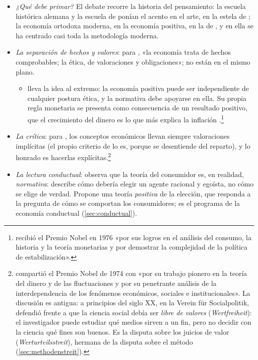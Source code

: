 \documentclass[11pt]{article}
\begin{document}
\begin{itemize}
\item \emph{¿Qué debe primar?} El debate recorre la historia del pensamiento: la escuela histórica alemana y la escuela de  ponían el acento en el arte, en la estela de ; la economía ortodoxa moderna, en la economía positiva, en la de , y en ella se ha centrado casi toda la metodología moderna.
\item \emph{La separación de hechos y valores}: para \textcite[pág.~132]{Robbins1932Essay}, «la economía trata de hechos comprobables; la ética, de valoraciones y obligaciones»; no están en el mismo plano.
  \begin{itemize}
  \item \textcite{Friedman1953Methodology} lleva la idea al extremo: la economía positiva puede ser independiente de cualquier postura ética, y la normativa debe apoyarse en ella. Su propia regla monetaria se presenta como consecuencia de un resultado positivo, que el crecimiento del dinero es lo que más explica la inflación .\footnote{ recibió el Premio Nobel en 1976 «por sus logros en el análisis del consumo, la historia y la teoría monetarias y por demostrar la complejidad de la política de estabilización»\nocite{Nobel1976Friedman}.}
  \end{itemize}
\item \emph{La crítica}: para  \parencite*{Myrdal1953Political}, los conceptos económicos llevan siempre valoraciones implícitas (el propio criterio de  lo es, porque se desentiende del reparto), y lo honrado es hacerlas explícitas.\footnote{ compartió el Premio Nobel de 1974 con  «por su trabajo pionero en la teoría del dinero y de las fluctuaciones y por su penetrante análisis de la interdependencia de los fenómenos económicos, sociales e institucionales»\nocite{Nobel1974}. La discusión es antigua: a principios del siglo XX, en la Verein für Socialpolitik,  defendió frente a  que la ciencia social debía ser \emph{libre de valores} (\emph{Wertfreiheit}): el investigador puede estudiar qué medios sirven a un fin, pero no decidir con la ciencia qué fines son buenos\nocite{Weber1904Objektivitat}. Es la disputa sobre los juicios de valor (\emph{Werturteilsstreit}), hermana de la disputa sobre el método (\ref{sec:methodenstreit}).}
\item \emph{La lectura conductual}: \textcite{Thaler1980Positive} observa que la teoría del consumidor es, en realidad, \emph{normativa}: describe cómo debería elegir un agente racional y egoísta, no cómo se elige de verdad. Propone una teoría \emph{positiva} de la elección, que responda a la pregunta de cómo se comportan los consumidores; es el programa de la economía conductual (\ref{sec:conductual}).

\end{itemize}
\end{document}
